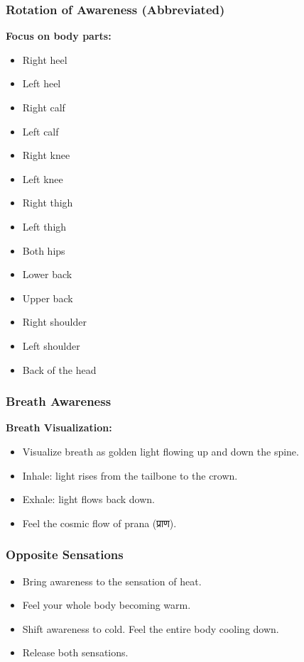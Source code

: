 \begin{frame}[fragile]\frametitle{Rotation of Awareness (Abbreviated)}
    \textbf{Focus on body parts:}
    \begin{multicols}{2}
    \begin{itemize}
        \item Right heel
        \item Left heel
        \item Right calf
        \item Left calf
        \item Right knee
        \item Left knee
        \item Right thigh
        \item Left thigh
    \end{itemize}
    \columnbreak
    \begin{itemize}
        \item Both hips
        \item Lower back
        \item Upper back
        \item Right shoulder
        \item Left shoulder
        \item Back of the head
    \end{itemize}
    \end{multicols}
\end{frame}

\begin{frame}[fragile]\frametitle{Breath Awareness}
    \textbf{Breath Visualization:}
    \begin{itemize}
        \item Visualize breath as golden light flowing up and down the spine.
        \item Inhale: light rises from the tailbone to the crown.
        \item Exhale: light flows back down.
        \item Feel the cosmic flow of prana (प्राण).
    \end{itemize}
\end{frame}

\begin{frame}[fragile]\frametitle{Opposite Sensations}
    \begin{itemize}
        \item Bring awareness to the sensation of heat.
        \item Feel your whole body becoming warm.
        \item Shift awareness to cold. Feel the entire body cooling down.
        \item Release both sensations.
    \end{itemize}
\end{frame}

